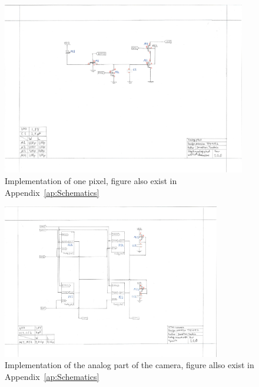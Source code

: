 \begin{figure}[htbp]
  \centering
  \includegraphics[width=0.95\textwidth]{figures/SchematicPixel}
  \caption{Implementation of one pixel, figure also exist in Appendix~\ref{ap:Schematics}}
  \label{fig:implpixel}
\end{figure}
\begin{figure}[htbp]
  \centering
  \includegraphics[width=0.85\textwidth]{figures/SchematicCamera}
  \caption{Implementation of the analog part of the camera, figure allso exist in Appendix~\ref{ap:Schematics}}
  \label{fig:implcamera}
\end{figure}